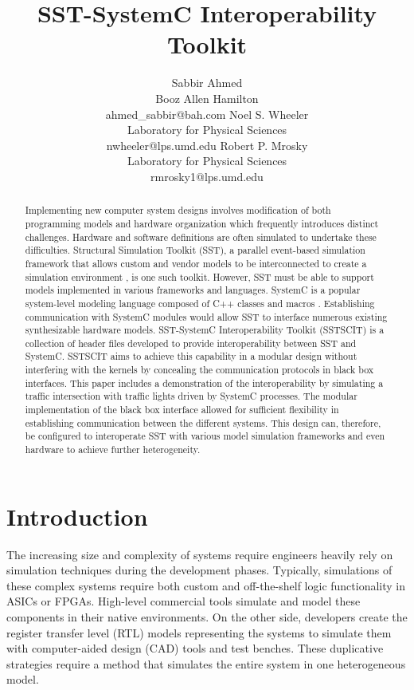 \documentclass{article}
\title{SST-SystemC Interoperability Toolkit}
\author{
  Sabbir Ahmed \\
  Booz Allen Hamilton \\
  ahmed\_sabbir@bah.com
  \And
  Noel S. Wheeler \\
  Laboratory for Physical Sciences \\
  nwheeler@lps.umd.edu
  \And
  Robert P. Mrosky \\
  Laboratory for Physical Sciences \\
  rmrosky1@lps.umd.edu
}
\begin{document}
  \maketitle

  \begin{abstract}
    Implementing new computer system designs involves modification of both programming models and
    hardware organization which frequently introduces distinct challenges. Hardware and software
    definitions are often simulated to undertake these difficulties. Structural Simulation Toolkit
    (SST), a parallel event-based simulation framework that allows custom and vendor models to be
    interconnected to create a simulation environment \cite{sst}, is one such toolkit. However, SST
    must be able to support models implemented in various frameworks and languages. SystemC is a
    popular system-level modeling language composed of C++ classes and macros \cite{sysc}.
    Establishing communication with SystemC modules would allow SST to interface numerous existing
    synthesizable hardware models. SST-SystemC Interoperability Toolkit (SSTSCIT) is a collection of
    header files developed to provide interoperability between SST and SystemC. SSTSCIT aims to
    achieve this capability in a modular design without interfering with the kernels by concealing
    the communication protocols in black box interfaces. This paper includes a demonstration of
    the interoperability by simulating a traffic intersection with traffic lights driven by SystemC
    processes. The modular implementation of the black box interface allowed for sufficient
    flexibility in establishing communication between the different systems. This design can,
    therefore, be configured to interoperate SST with various model simulation frameworks and
    even hardware to achieve further heterogeneity.
  \end{abstract}

  \section{Introduction}  
  The increasing size and complexity of systems require engineers heavily rely on simulation
  techniques during the development phases. Typically, simulations of these complex systems require
  both custom and off-the-shelf logic functionality in ASICs or FPGAs. High-level commercial tools
  simulate and model these components in their native environments. On the other side, developers
  create the register transfer level (RTL) models representing the systems to simulate them with
  computer-aided design (CAD) tools and test benches. These duplicative strategies require a method
  that simulates the entire system in one heterogeneous model.
\end{document}
